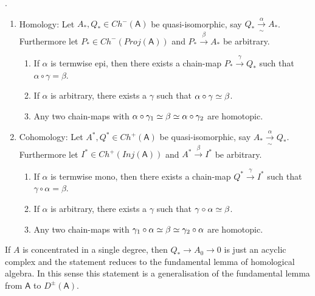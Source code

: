\documentclass[fontsize=11pt,fleqn,a4paper]{scrartcl}
\begin{document}
\begin{lemma}
.
\begin{multicols}{2}
\begin{enumerate}
\item Homology: Let $A_\ast,Q_\ast \in Ch^-(\mathsf{A})$ be quasi-isomorphic, say $Q_\ast \xrightarrow[\sim]{\alpha} A_\ast$. Furthermore let $P_\ast\in Ch^-(Proj(\mathsf{A}))$ and $P_\ast \xrightarrow{\beta} A_\ast$ be arbitrary.

\begin{enumerate}
\item If $\alpha$ is termwise epi, then there exists a chain-map $P_\ast \xrightarrow{\gamma} Q_\ast$ such that $\alpha\circ\gamma = \beta$.
\item If $\alpha$ is arbitrary, there exists a $\gamma$ such that $\alpha\circ\gamma \overset{}{\simeq} \beta$.
\item Any two chain-maps with $\alpha\circ\gamma_1\overset{}{\simeq}\beta\overset{}{\simeq}\alpha\circ\gamma_2$ are homotopic.
\end{enumerate}

\item Cohomology: Let $A^\ast,Q^\ast \in Ch^+(\mathsf{A})$ be quasi-isomorphic, say $A_\ast \xrightarrow[\sim]{\alpha} Q_\ast$. Furthermore let $I^\ast\in Ch^+(Inj(\mathsf{A}))$ and $A^\ast \xrightarrow{\beta} I^\ast$ be arbitrary.

\begin{enumerate}
\item If $\alpha$ is termwise mono, then there exists a chain-map $Q^\ast \xrightarrow{\gamma} I^\ast $ such that $\gamma\circ\alpha = \beta$.
\item If $\alpha$ is arbitrary, there exists a $\gamma$ such that $\gamma\circ\alpha\overset{}{\simeq} \beta$.
\item Any two chain-maps with $\gamma_1\circ\alpha\overset{}{\simeq}\beta\overset{}{\simeq}\gamma_2\circ\alpha$ are homotopic.
\end{enumerate}
\end{enumerate}
\end{multicols}
\end{lemma}
\begin{remark}
If $A$ is concentrated in a single degree, then $Q_\ast \to A_0\to 0$ is just an acyclic complex and the statement reduces to the fundamental lemma of homological algebra. In this sense this statement is a generalisation of the fundamental lemma from $\mathsf{A}$ to $D^\pm(\mathsf{A})$.
\end{remark}
\end{document}
